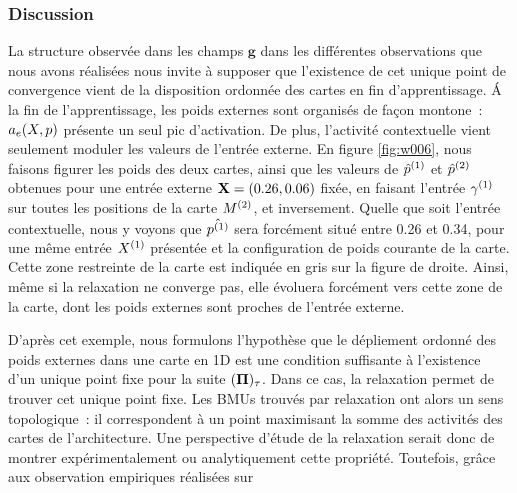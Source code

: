 \documentclass[../main]{subfiles}
\begin{document}
\subsubsection{Discussion}

La structure observée dans les champs $\mathbf{g}$ dans les différentes observations que nous avons réalisées nous invite à supposer que l'existence de cet unique point de convergence vient de la disposition ordonnée des cartes en fin d'apprentissage. 
\'A la fin de l'apprentissage, les poids externes sont organisés de façon montone~: $a_e(X,p)$ présente un seul pic d'activation. 
De plus, l'activité contextuelle vient seulement moduler les valeurs de l'entrée externe.
En figure \ref{fig:w006}, nous faisons figurer les poids des deux cartes, ainsi que les valeurs de $\hat{p}^{({1})}$ et $\hat{p}^{({2})}$ obtenues pour une entrée externe $\mathbf{X} = (0.26, 0.06)$ fixée, en faisant l'entrée $\gamma^{({1})}$ sur toutes les positions de la carte $M^{({2})}$, et inversement.
Quelle que soit l'entrée contextuelle, nous y voyons que $\hat{p^{({1})}}$ sera forcément situé entre 0.26 et 0.34, pour une même entrée $X^{({1})}$ présentée et la configuration de poids courante de la carte. Cette zone restreinte de la carte est indiquée en gris sur la figure de droite.
Ainsi, même si la relaxation ne converge pas, elle évoluera forcément vers cette zone de la carte, dont les poids externes sont proches de l'entrée externe.

D'après cet exemple, nous formulons l'hypothèse que le dépliement ordonné des poids externes dans une carte en 1D est une condition suffisante à l'existence d'un unique point fixe pour la suite $(\mathbf{\Pi})_\tau$.
Dans ce cas, la relaxation permet de trouver cet unique point fixe.
Les BMUs trouvés par relaxation ont alors un sens topologique~: il correspondent à un point maximisant la somme des activités des cartes de l'architecture.
Une perspective d'étude de la relaxation serait donc de montrer expérimentalement ou analytiquement cette propriété. 
Toutefois, grâce aux observation empiriques réalisées sur 
\end{document}
